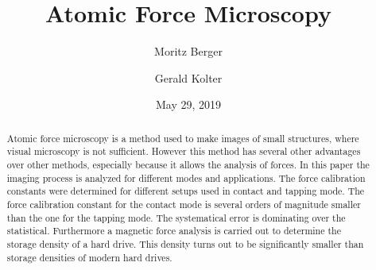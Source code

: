 \documentclass[%
 reprint,
amsmath,amssymb,
pra,
]{revtex4-1}
\begin{document}

\title{Atomic Force Microscopy}%

\author{Moritz Berger}
 \author{Gerald Kolter}

\date{May 29, 2019}

\begin{abstract}
Atomic force microscopy is a method used to make images of small structures, where  visual microscopy is not sufficient. However this method has several other advantages over other methods, especially because it allows the analysis of forces. In this paper the imaging process is analyzed for different modes and applications.
The force calibration constants were determined for different setups used in contact and tapping mode. The force calibration constant for the contact mode is several orders of magnitude smaller than the one for the tapping mode. The systematical error is dominating over the statistical. Furthermore a magnetic force analysis is carried out to determine the storage density of a hard drive. This density turns out to be significantly smaller than storage densities of modern hard drives.
\end{abstract}

\maketitle
\end{document}

